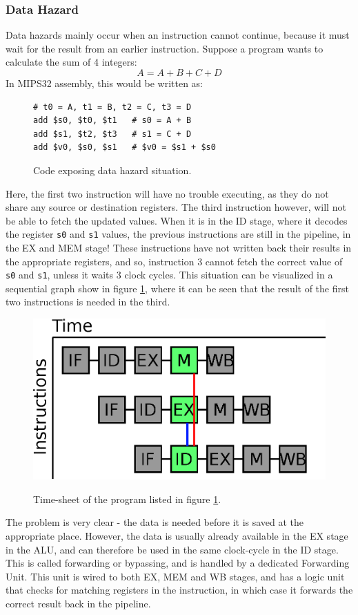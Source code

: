 \subsubsection{Data Hazard}
Data hazards mainly occur when an instruction cannot continue, because it must
wait for the result from an earlier instruction. Suppose a program wants to
calculate the sum of 4 integers:
$$A = A + B + C + D$$
In MIPS32 assembly, this would be written as:
\begin{figure}[H]
	\centering
	\begin{lstlisting}
# t0 = A, t1 = B, t2 = C, t3 = D
add $s0, $t0, $t1 	# s0 = A + B
add $s1, $t2, $t3	# s1 = C + D
add $v0, $s0, $s1	# $v0 = $s1 + $s0
	\end{lstlisting}
	\caption{Code exposing data hazard situation.}
	\label{fig:data_hazard_code}
\end{figure}
Here, the first two instruction will have no trouble executing, as they do not
share any source or destination registers. The third instruction however, will
not be able to fetch the updated values. When it is in the ID stage, where it decodes the
register \texttt{s0} and \texttt{s1} values, the previous instructions are
still in the pipeline, in the EX and MEM stage! These instructions have not
written back their results in the appropriate registers, and so, instruction 3
cannot fetch the correct value of \texttt{s0} and \texttt{s1}, unless it waits 3 clock
cycles. This situation can be visualized in a sequential graph show in figure
\ref{fig:data_hazard_code}, where it can be seen that the result of the first
two instructions is needed in the third.\\
\begin{figure}[H]
	\centering
	\includegraphics[scale=0.4]{pipeline/data_hazard.eps}
	\label{fig:data_hazard}
	\caption{Time-sheet of the program listed in figure
\ref{fig:data_hazard_code}.}
\end{figure}
The problem is very clear - the data is needed before it is saved at the
appropriate place. However, the data is usually already available in the EX
stage in the ALU, and can therefore be used in the same clock-cycle in the ID
stage. This is called forwarding or bypassing, and is handled by a dedicated
Forwarding Unit. This unit is wired to both EX, MEM and WB stages, and has a
logic unit that checks for matching registers in the instruction, in which case
it forwards the correct result back in the pipeline.

